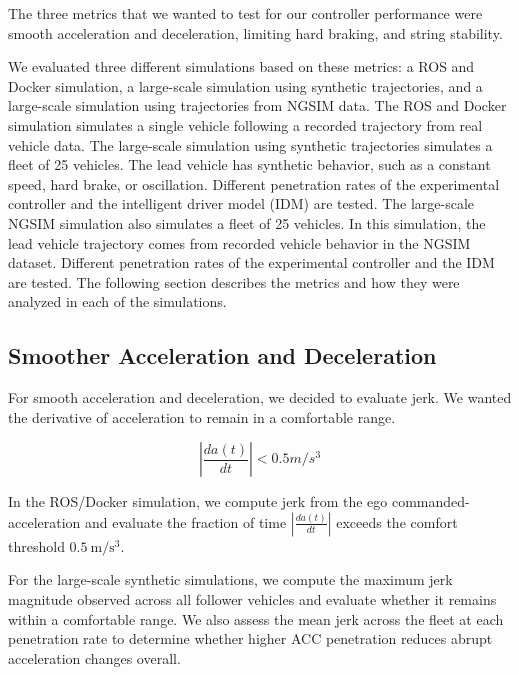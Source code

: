 \documentclass[conference]{IEEEtran}
\begin{document}
The three metrics that we wanted to test for our controller performance were smooth acceleration and deceleration, limiting hard braking, and string stability.

We evaluated three different simulations based on these metrics: a ROS and Docker simulation, a large-scale simulation using synthetic trajectories, and a large-scale simulation using trajectories from NGSIM \cite{FHWA_NGSIM_2006} data. The ROS and Docker simulation simulates a single vehicle following a recorded trajectory from real vehicle data. The large-scale simulation using synthetic trajectories simulates a fleet of 25 vehicles. The lead vehicle has synthetic behavior, such as a constant speed, hard brake, or oscillation. Different penetration rates of the experimental controller and the intelligent driver model (IDM) \cite{PhysRevE.62.1805} are tested. The large-scale NGSIM simulation also simulates a fleet of 25 vehicles. In this simulation, the lead vehicle trajectory comes from recorded vehicle behavior in the NGSIM dataset. Different penetration rates of the experimental controller and the IDM are tested. The following section describes the metrics and how they were analyzed in each of the simulations.

\subsection{Smoother Acceleration and Deceleration}

For smooth acceleration and deceleration, we decided to evaluate jerk. We wanted the derivative of acceleration to remain in a comfortable range.

\begin{equation}
    \left| \frac{da(t)}{dt} \right| < 0.5 m/s^3 
\end{equation}



In the ROS/Docker simulation, we compute jerk from the ego commanded-acceleration and evaluate the fraction of time \(\left| \frac{da(t)}{dt} \right|\) exceeds the comfort threshold \(0.5~\mathrm{m/s^3}\).


For the large-scale synthetic simulations, we compute the maximum jerk magnitude observed across all follower vehicles and evaluate whether it remains within a comfortable range. We also assess the mean jerk across the fleet at each penetration rate to determine whether higher ACC penetration reduces abrupt acceleration changes overall.
\end{document}
